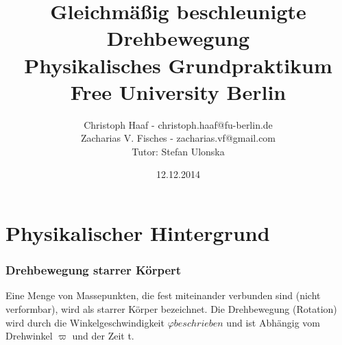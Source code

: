 \documentclass[%
   final,      %
   paper=a4, paper=portrait, pagesize=auto, %
   fontsize=11pt, %
   ngerman, %
 ]{scrartcl} %
\begin{document}
%

\subject{Protokoll}
\title{Gleichmäßig beschleunigte Drehbewegung \\ \normalsize Physikalisches Grundpraktikum \\ Free University Berlin}
\date{12.12.2014}
\author{Christoph Haaf - christoph.haaf@fu-berlin.de  \\ Zacharias V. Fisches - zacharias.vf@gmail.com \\ Tutor: Stefan Ulonska}


\maketitle




\tableofcontents
\newpage

%
%

%

\section{Physikalischer Hintergrund}
\subsubsection{Drehbewegung starrer Körpert}
Eine Menge von Massepunkten, die fest miteinander verbunden sind (nicht verformbar), wird als starrer Körper bezeichnet. Die Drehbewegung (Rotation) wird durch die Winkelgeschwindigkeit $\varphi beschrieben$ und ist Abhängig vom Drehwinkel $\varpi$ und der Zeit t.
\end{document}
